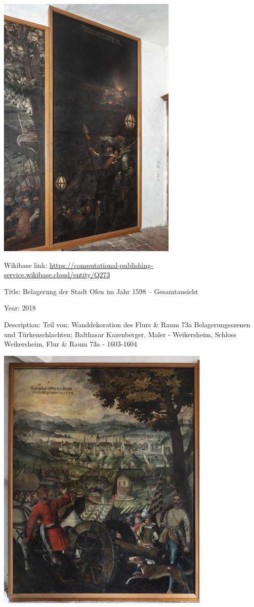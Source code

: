 \documentclass[
  letterpaper,
]{book}
\begin{document}
\includegraphics{paintings_files/figure-pdf/cell-3-output-36.png}

Wikibase link:
\url{https://computational-publishing-service.wikibase.cloud/entity/Q273}

Title: Belagerung der Stadt Ofen im Jahr 1598 -- Gesamtansicht

Year: 2018

Description: Teil von: Wanddekoration des Flurs \& Raum 73a
Belagerungsszenen und Türkenschlachten; Balthasar Kazenberger, Maler -
Weikersheim, Schloss Weikersheim, Flur \& Raum 73a - 1603-1604

\includegraphics{paintings_files/figure-pdf/cell-3-output-38.png}
\end{document}
